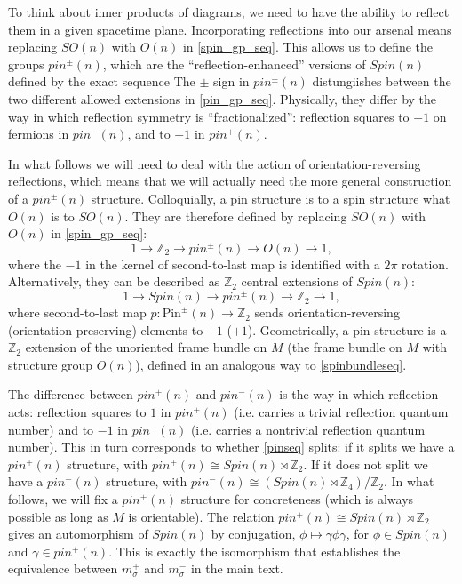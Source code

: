 \documentclass[12pt,a4paper]{article}
\newcounter{arrow}
\newcommand{\ra}{\rightarrow}
\newcommand{\zz}{\mathbb{Z}}
\newcommand{\zt}{\mathbb{Z}_2}
\newcommand\be            {\begin{equation}}
\newcommand\ee            {\end{equation}}
\newcommand{\pin}{\text{Pin}}
\begin{document}

To think about inner products of diagrams, we need to have the ability to reflect them in a given spacetime plane. Incorporating reflections into our arsenal means replacing $SO(n)$ with $O(n)$ in \eqref{spin_gp_seq}. This allows us to define the groups $pin^\pm(n)$, which are the ``reflection-enhanced'' versions of $Spin(n)$ defined by the exact sequence 
 The $\pm$ sign in $pin^\pm(n)$ distungiishes between the two different allowed extensions in \eqref{pin_gp_seq}. Physically, they differ by the way in which reflection symmetry is ``fractionalized'': reflection squares to $-1$ on fermions in $pin^-(n)$, and to $+1$ in $pin^+(n)$. 


In what follows we will need to deal with the action of orientation-reversing reflections, which means that we will actually need the more general construction of a $pin^\pm(n)$ structure. Colloquially, a pin structure is to a spin structure what $O(n)$ is to $SO(n)$. They are therefore defined by replacing $SO(n)$ with $O(n)$ in \eqref{spin_gp_seq}:
\be \label{pin_gp_seq} 1 \ra \zt \ra pin^\pm(n) \ra O(n) \ra 1,\ee
where the $-1$ in the kernel of second-to-last map is identified with a $2\pi$ rotation.
Alternatively, they can be described as $\zt$ central extensions of $Spin(n)$:
\be \label{pinseq} 1\ra Spin(n) \ra pin^\pm(n) \ra \zt \ra 1,\ee 
where second-to-last map $p : \pin^\pm(n) \ra \zt$ sends orientation-reversing (orientation-preserving) elements to $-1$ ($+1$). Geometrically, a pin structure is a $\zt$ extension of the unoriented frame bundle on $M$ (the frame bundle on $M$ with structure group $O(n)$), defined in an analogous way to \eqref{spinbundleseq}.

The difference between $pin^+(n)$ and $pin^-(n)$ is the way in which reflection acts: reflection squares to $1$ in $pin^+(n)$ (i.e. carries a trivial reflection quantum number) and to $-1$ in $pin^-(n)$ (i.e. carries a nontrivial reflection quantum number). This in turn corresponds to whether \eqref{pinseq} splits: if it splits we have a $pin^+(n)$ structure, with $pin^+(n) \cong Spin(n) \rtimes \zt$. If it does not split we have a $pin^-(n)$ structure, with $pin^-(n) \cong (Spin(n) \rtimes \zz_4)/\zt$. In what follows, we will fix a $pin^+(n)$ structure for concreteness (which is always possible as long as $M$ is orientable). The relation $pin^+(n) \cong Spin(n) \rtimes \zt$ gives an automorphism of $Spin(n)$ by conjugation, $\phi \mapsto \gamma \phi \gamma$, for $\phi \in Spin(n)$ and $\gamma \in pin^+(n)$. This is exactly the isomorphism that establishes the equivalence between $m_\sigma^+$ and $m_\sigma^-$ in the main text. 
\end{document}
